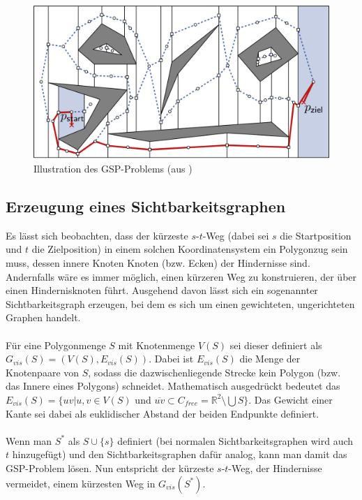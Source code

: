 \documentclass[a4paper, notitlepage, 12pt]{scrartcl}
\begin{document}
 \begin{figure}[H]
 	\includegraphics[scale=0.41]{pics/gsp}
 	\caption{Illustration des GSP-Problems (aus \cite{Src:noem})}
 \end{figure}
 \subsection{Erzeugung eines Sichtbarkeitsgraphen}
 Es lässt sich beobachten, dass der kürzeste $s$-$t$-Weg (dabei sei $s$ die Startposition und $t$ die Zielposition) in einem solchen Koordinatensystem ein Polygonzug sein muss, dessen innere Knoten Knoten (bzw. Ecken) der Hindernisse sind. Andernfalls wäre es immer möglich, einen kürzeren Weg zu konstruieren, der über einen Hindernisknoten führt.\cite{Src:noem} Ausgehend davon lässt sich ein sogenannter Sichtbarkeitsgraph erzeugen, bei dem es sich um einen gewichteten, ungerichteten Graphen handelt. \\ \\
 Für eine Polygonmenge $S$ mit Knotenmenge $V(S)$ sei dieser definiert als $G_{vis}(S) = (V(S),E_{vis}(S))$. Dabei ist $E_{vis}(S)$ die Menge der Knotenpaare von $S$, sodass die dazwischenliegende Strecke kein Polygon (bzw. das Innere eines Polygons) schneidet. Mathematisch ausgedrückt bedeutet das $E_{vis}(S) = \{ uv | u,v \in V(S)$ und $\overline{uv} \subset C_{free} = \mathbb{R}^{2} \setminus \bigcup S \}$. Das Gewicht einer Kante sei dabei als euklidischer Abstand der beiden Endpunkte definiert. \\ \\
 Wenn man $S^{*}$ als $S \cup \{s\}$ definiert (bei normalen Sichtbarkeitsgraphen wird auch $t$ hinzugefügt) und den Sichtbarkeitsgraphen dafür analog, kann man damit das GSP-Problem lösen. Nun entspricht der kürzeste $s$-$t$-Weg, der Hindernisse vermeidet, einem kürzesten Weg in $G_{vis}(S^{*})$.
\end{document}
